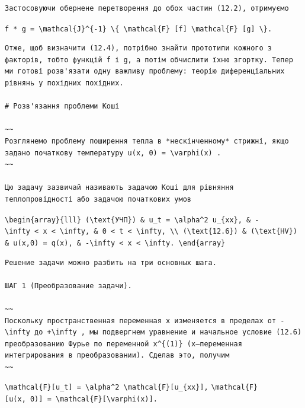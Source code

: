 \documentclass[
  ukrainian,
]{article}
\begin{document}
\begin{verbatim}
Застосовуючи обернене перетворення до обох частин (12.2), отримуємо
\end{verbatim}

\texttt{f\ *\ g\ =\ \textbackslash{}mathcal\{J\}\^{}\{-1\}\ \textbackslash{}\{\ \textbackslash{}mathcal\{F\}\ {[}f{]}\ \textbackslash{}mathcal\{F\}\ {[}g{]}\ \textbackslash{}\}.}

\begin{verbatim}
Отже, щоб визначити (12.4), потрібно знайти прототипи кожного з факторів, тобто функцій f і g, а потім обчислити їхню згортку. Тепер ми готові розв'язати одну важливу проблему: теорію диференціальних рівнянь у похідних похідних.

# Розв'язання проблеми Коші

~~
Розглянемо проблему поширення тепла в *нескінченному* стрижні, якщо задано початкову температуру u(x, 0) = \varphi(x) .
~~

Цю задачу зазвичай називають задачою Коші для рівняння теплопровідності або задачою початкових умов
\end{verbatim}

\texttt{\textbackslash{}begin\{array\}\{lll\}\ (\textbackslash{}text\{УЧП\})\ \&\ u\_t\ =\ \textbackslash{}alpha\^{}2\ u\_\{xx\},\ \&\ -\textbackslash{}infty\ \textless{}\ x\ \textless{}\ \textbackslash{}infty,\ \&\ 0\ \textless{}\ t\ \textless{}\ \textbackslash{}infty,\ \textbackslash{}\textbackslash{}\ (\textbackslash{}text\{12.6\})\ \&\ (\textbackslash{}text\{HV\})\ \&\ u(x,0)\ =\ q(x),\ \&\ -\textbackslash{}infty\ \textless{}\ x\ \textless{}\ \textbackslash{}infty.\ \textbackslash{}end\{array\}}

\begin{verbatim}
Решение задачи можно разбить на три основных шага.

ШАГ 1 (Преобразование задачи).

~~
Поскольку пространственная переменная x изменяется в пределах от -\infty до +\infty , мы подвергнем уравнение и начальное условие (12.6) преобразованию Фурье по переменной x^{(1)} (x—переменная интегрирования в преобразовании). Сделав это, получим
~~
\end{verbatim}

\texttt{\textbackslash{}mathcal\{F\}{[}u\_t{]}\ =\ \textbackslash{}alpha\^{}2\ \textbackslash{}mathcal\{F\}{[}u\_\{xx\}{]},}
\texttt{\textbackslash{}mathcal\{F\}{[}u(x,\ 0){]}\ =\ \textbackslash{}mathcal\{F\}{[}\textbackslash{}varphi(x){]}.}
\end{document}
